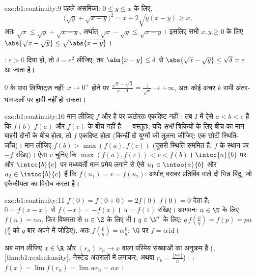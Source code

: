 \begin{solution}{exo:b1:continuity:9}
पहले असमिका: $0 \leq y \leq x$ के लिए,
\[
\bigl(\sqrt y + \sqrt{x - y}\bigr)^2 = x + 2\sqrt{y(x-y)} \geq x,
\]
अतः $\sqrt x \leq \sqrt y + \sqrt{x - y}$, अर्थात् $\sqrt x - \sqrt y \leq
\sqrt{x - y}$। इसलिए सभी $x, y \geq 0$ के लिए $\abs{\sqrt x - \sqrt y} \leq
\sqrt{\abs{x - y}}$।

: $\varepsilon > 0$ दिया हो, तो $\delta = \varepsilon^2$
लीजिए; तब $\abs{x - y} \leq \delta$ से $\abs{\sqrt x - \sqrt y} \leq
\sqrt\delta = \varepsilon$ आ जाता है।

$0$ के पास लिप्शिट्ज़ नहीं: $x \to 0^+$ होने पर $\frac{\sqrt x - \sqrt 0}{x
- 0} = \frac{1}{\sqrt x} \to +\infty$, अतः कोई अचर $k$ सभी अंतर-भागफलों पर
हावी नहीं हो सकता।
\end{solution}

\begin{solution}{exo:b1:continuity:10}
मान लीजिए $f$  और  है पर कठोरतः एकदिष्ट नहीं। तब $I$ में ऐसे $a < b
< c$ हैं कि $f(b)$ $f(a)$ और $f(c)$ के बीच नहीं है --- वस्तुतः, यदि
\emph{सभी} त्रिकियों के लिए बीच का मान बाहरी दोनों के बीच होता, तो $f$
एकदिष्ट होता (किन्हीं दो युग्मों की तुलना कीजिए; एक छोटी स्थिति-जाँच)। मान
लीजिए $f(b) > \max(f(a), f(c))$ (दूसरी स्थिति सममित है, $f$ के स्थान पर $-f$
रखिए)। ऐसा $v$ चुनिए कि $\max(f(a), f(c)) < v < f(b)$। $\intcc{a}{b}$ पर और
$\intcc{b}{c}$ पर मध्यवर्ती मान प्रमेय लगाने से ऐसे $u_1 \in \intoo{a}{b}$
और $u_2 \in \intoo{b}{c}$ हैं कि $f(u_1) = v = f(u_2)$: अर्थात् बराबर
प्रतिबिंब वाले दो भिन्न बिंदु, जो एकैकीयता का विरोध करता है।
\end{solution}

\begin{solution}{exo:b1:continuity:11}
$f(0) = f(0+0) = 2f(0)$ $f(0) = 0$ देता है; $0 = f(x - x)$ से $f(-x) =
-f(x)$। $\alpha = f(1)$ रखिए। आगमन: $n \in \N$ के लिए $f(n) = n\alpha$, फिर
विषमता से $n \in \Z$ के लिए भी। $q \in \N^*$ के लिए: $q\,f(\frac pq) = f(p)
= p\alpha$ ($\frac pq$ को $q$ बार अपने में जोड़िए), अतः $f(\frac pq) =
\alpha\frac pq$: $\Q$ पर $f = \alpha\, \mathrm{id}$।

अब मान लीजिए $x \in \R$ और $(r_n)$ $r_n \to x$ वाला परिमेय संख्याओं का
अनुक्रम है (, \cref{thm:b1:reals:density}, नेस्टेड अंतरालों में लगाकर;
अथवा $r_n = \frac{\lfloor nx\rfloor}{n}$)। : $f(x) = \lim f(r_n) =
\lim \alpha r_n = \alpha x$।
\end{solution}

